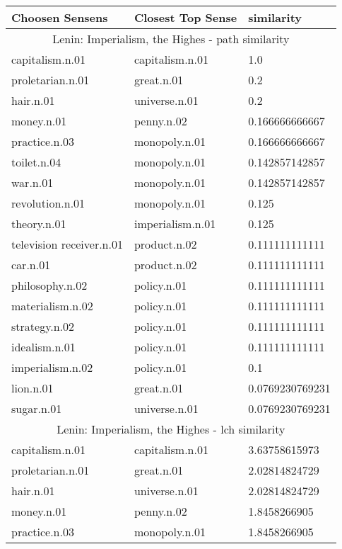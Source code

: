 
    \begin{center}
      \begin{tabular}{ | l | l | l |}
        \hline
        Choosen Sensens & Closest Top Sense & similarity  \\ \hline
\multicolumn{3}{|c|}{Lenin: Imperialism, the Highes - path similarity} \\ \hline
capitalism.n.01 & capitalism.n.01 & 1.0\\ \hline
proletarian.n.01 & great.n.01 & 0.2\\ \hline
hair.n.01 & universe.n.01 & 0.2\\ \hline
money.n.01 & penny.n.02 & 0.166666666667\\ \hline
practice.n.03 & monopoly.n.01 & 0.166666666667\\ \hline
toilet.n.04 & monopoly.n.01 & 0.142857142857\\ \hline
war.n.01 & monopoly.n.01 & 0.142857142857\\ \hline
revolution.n.01 & monopoly.n.01 & 0.125\\ \hline
theory.n.01 & imperialism.n.01 & 0.125\\ \hline
television receiver.n.01 & product.n.02 & 0.111111111111\\ \hline
car.n.01 & product.n.02 & 0.111111111111\\ \hline
philosophy.n.02 & policy.n.01 & 0.111111111111\\ \hline
materialism.n.02 & policy.n.01 & 0.111111111111\\ \hline
strategy.n.02 & policy.n.01 & 0.111111111111\\ \hline
idealism.n.01 & policy.n.01 & 0.111111111111\\ \hline
imperialism.n.02 & policy.n.01 & 0.1\\ \hline
lion.n.01 & great.n.01 & 0.0769230769231\\ \hline
sugar.n.01 & universe.n.01 & 0.0769230769231\\ \hline
\multicolumn{3}{|c|}{Lenin: Imperialism, the Highes - lch similarity} \\ \hline
capitalism.n.01 & capitalism.n.01 & 3.63758615973\\ \hline
proletarian.n.01 & great.n.01 & 2.02814824729\\ \hline
hair.n.01 & universe.n.01 & 2.02814824729\\ \hline
money.n.01 & penny.n.02 & 1.8458266905\\ \hline
practice.n.03 & monopoly.n.01 & 1.8458266905\\ \hline

\end{tabular}
\end{center}
